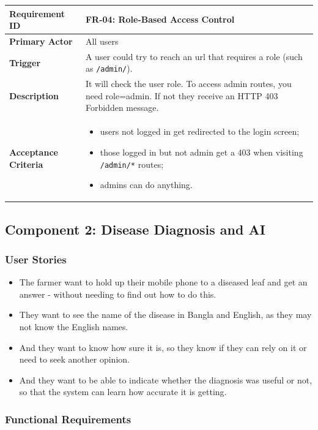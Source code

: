 \documentclass[12pt,a4paper]{article}
\newcommand{\frbox}[5]{%
  \begin{table}[H]
  \centering
  \begin{tabularx}{\textwidth}{|l|X|}
  \hline
  \rowcolor{lightgreen}
  \textbf{Requirement ID} & \textbf{#1} \\
  \hline
  \textbf{Primary Actor} & #2 \\
  \hline
  \textbf{Trigger} & #3 \\
  \hline
  \textbf{Description} & #4 \\
  \hline
  \rowcolor{lightgreen}
  \textbf{Acceptance Criteria} & #5 \\
  \hline
  \end{tabularx}
  \end{table}
}
\begin{document}
\frbox{FR-04: Role-Based Access Control}
{All users}
{A user could try to reach an url that requires a role (such as \texttt{/admin/}).}
{It will check the user role. To access admin routes, you need role=admin. If not they receive an HTTP 403 Forbidden message.}
{%
\begin{itemize}[leftmargin=1.5em]
  \item users not logged in get redirected to the login screen;
  \item those logged in but not admin get a 403 when visiting \texttt{/admin/*} routes;
  \item admins can do anything.
\end{itemize}
}

\subsection{Component 2: Disease Diagnosis and AI}
\subsubsection*{User Stories}

\begin{itemize}[leftmargin=2em]
  \item The farmer want to hold up their mobile phone to a diseased leaf and get an answer - without needing to find out how to do this.
  \item They want to see the name of the disease in Bangla and English, as they may not know the English names.
  \item And they want to know how sure it is, so they know if they can rely on it or need to seek another opinion.
  \item And they want to be able to indicate whether the diagnosis was useful or not, so that the system can learn how accurate it is getting.
\end{itemize}

\subsubsection*{Functional Requirements}
\end{document}
